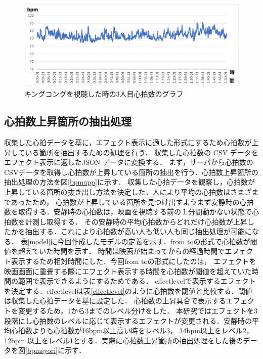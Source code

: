\begin{figure}[H]
    \centering
    \includegraphics[width=16cm]{images/chapter3/gurafu1.png}
    \caption{キングコングを視聴した時の3人目心拍数のグラフ}
    \label{sannninme}
\end{figure}

\subsection{心拍数上昇箇所の抽出処理}
収集した心拍データを基に，エフェクト表示に適した形式にするため心拍数が上昇している箇所を抽出するための処理を行う．
収集した心拍数の CSV データをエフェクト表示に適したJSON データに変換する．
まず，サーバから心拍数のCSVデータを取得し心拍数が上昇している箇所の抽出を行う．心拍数上昇箇所の抽出処理の方法を図\ref{bpmupp}に示す．
収集した心拍データを観察し，心拍数が上昇している箇所の抜き出し方法を決定した．人により平均の心拍数はさまざまであったため，
心拍数が上昇している箇所を見つけ出すようまず安静時の心拍数を取得する．安静時の心拍数は，映画を視聴する前の１分間動かない状態で心拍数を計測し取得する．
その安静時の平均心拍数からどれだけ心拍数が上昇したかを抽出する．これにより心拍数が高い人も低い人も同じ抽出処理が可能になる．
表\ref{model}に今回作成したモデルの定義を示す．from toの形式で心拍数が閾値を超えていた時間を示す．
時間は映画が始まってからの経過時間でエフェクト表示するため相対時間にした．今回from toの形式にしたのは，
エフェクトを映画画面に重畳する際にエフェクト表示する時間を心拍数が閾値を超えていた時間の範囲で表示できるようにするためである．
effectlevelで表示するエフェクトを決定する．effectlevelは表\ref{effectlevel}のように心拍数を閾値と比較する．閾値は収集した心拍データを基に設定した．
心拍数の上昇具合で表示するエフェクトを変更するため，1から3までのレベル分けをした．
本研究ではエフェクトを3段階にし心拍数のレベルに応じて表示するエフェクトが変更される．安静時の平均心拍数よりも心拍数が16bpm以上高い時をレベル3，
14bpm以上をレベル2，12bpm 以上をレベル1とする．実際に心拍数上昇箇所の抽出処理をした後のデータを図\ref{bpmsyori}に示す．


